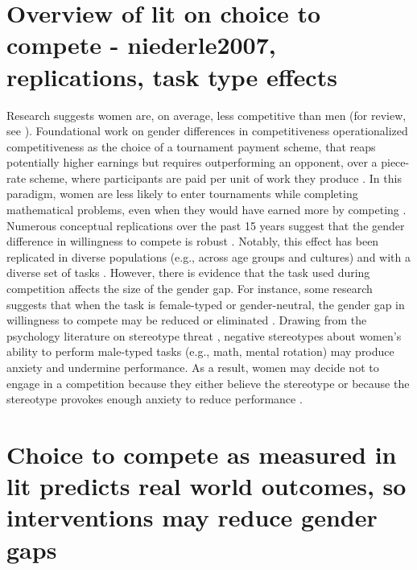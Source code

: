 \documentclass[a4paper,nobind]{templates/ociamthesis}
\begin{document}
\hypertarget{overview-of-lit-on-choice-to-compete---niederle2007-replications-task-type-effects}{%
\section{Overview of lit on choice to compete - niederle2007, replications, task type effects}\label{overview-of-lit-on-choice-to-compete---niederle2007-replications-task-type-effects}}

Research suggests women are, on average, less competitive than men (for review, see \textcite{Niederle2011}). Foundational work on gender differences in competitiveness operationalized competitiveness as the choice of a tournament payment scheme, that reaps potentially higher earnings but requires outperforming an opponent, over a piece-rate scheme, where participants are paid per unit of work they produce \autocite{Niederle2007}. In this paradigm, women are less likely to enter tournaments while completing mathematical problems, even when they would have earned more by competing \autocite{Niederle2007}. Numerous conceptual replications over the past 15 years suggest that the gender difference in willingness to compete is robust \autocites[see][ for review]{Niederle2011,Niederle2017a,Niederle2017b}. Notably, this effect has been replicated in diverse populations (e.g., across age groups and cultures) \autocite{Apicella2015,Buser2014,Sutter2016,Andersen2013,Buser2017b,Sutter2010,Dreber2014,Mayr2012} and with a diverse set of tasks \autocite{Apicella2015,Saccardo2018,Bjorvatn2016,Sutter2015,Frick2011,Samek2019}. However, there is evidence that the task used during competition affects the size of the gender gap. For instance, some research suggests that when the task is female-typed or gender-neutral, the gender gap in willingness to compete may be reduced or eliminated \autocite{Iriberri2017,Boschini2014,Boschini2019,Apicella2015,Grosse2010,Gunther2010,Dreber2014,Dreber2011,Shurchkov2012}. Drawing from the psychology literature on stereotype threat \autocite{Steele1997,Spencer1999,Spencer2016}, negative stereotypes about women's ability to perform male-typed tasks (e.g., math, mental rotation) may produce anxiety and undermine performance. As a result, women may decide not to engage in a competition because they either believe the stereotype or because the stereotype provokes enough anxiety to reduce performance \autocite{Gunther2010,Grosse2010,Iriberri2017,Shurchkov2012}.

\hypertarget{choice-to-compete-as-measured-in-lit-predicts-real-world-outcomes-so-interventions-may-reduce-gender-gaps}{%
\section{Choice to compete as measured in lit predicts real world outcomes, so interventions may reduce gender gaps}\label{choice-to-compete-as-measured-in-lit-predicts-real-world-outcomes-so-interventions-may-reduce-gender-gaps}}
\end{document}
